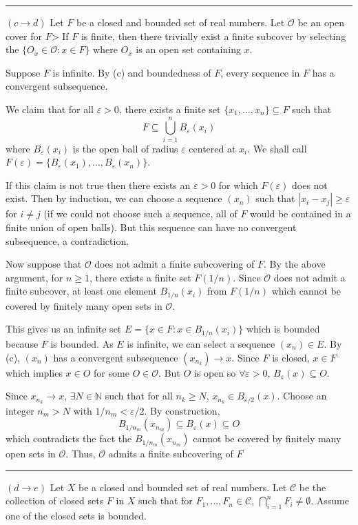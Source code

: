 \documentclass[12pt]{article}
\newcommand{\N}{\mathbb{N}}
\newcommand{\abs}[1]{\left\vert #1 \right\vert}
\newcommand{\ep}{\varepsilon}
\newcommand{\sub}{\subseteq}
\renewcommand{\div}{\vspace*{10pt}\hrule\vspace*{10pt}}
\begin{document}
    \div 

    $(c \to d)$ Let $F$ be a closed and bounded set of real numbers. Let $\mathcal{O}$ be an open cover for $F$> If $F$ is finite, then there trivially exist a finite subcover by selecting the $\{O_x \in \mathcal{O}: x \in F\}$ where $O_x$ is an open set containing $x$.

    Suppose $F$ is infinite. By (c) and boundedness of $F$, every sequence in $F$ has a convergent subsequence. 
    
    We claim that for all $\ep > 0$, there exists a finite set $\{x_1, \dots, x_n\} \sub F$ such that 
    \[F \sub \bigcup_{i=1}^n B_{\ep}(x_i)\] 
    where $B_{\ep}(x_i)$ is the open ball of radius $\ep$ centered at $x_i$. We shall call $F(\ep) = \{B_{\ep}(x_1), \dots, B_{\ep}(x_n)\}$. 

    If this claim is not true then there exists an $\ep > 0$ for which $F(\ep)$ does not exist. Then by induction, we can choose a sequence $(x_n)$ such that $\abs{x_i - x_j} \geq \ep$ for $i \neq j$ (if we could not choose such a sequence, all of $F$ would be contained in a finite union of open balls). But this sequence can have no convergent subsequence, a contradiction.

    Now suppose that $\mathcal O$ does not admit a finite subcovering of $F$. By the above argument, for $n \geq 1$, there exists a finite set $F(1/n)$. Since $\mathcal O$ does not admit a finite subcover, at least one element $B_{1/n}(x_i)$ from $F(1/n)$ which cannot be covered by finitely many open sets in $\mathcal O$. 

    This gives us an infinite set $E = \{x \in F: x \in B_{1/n}(x_i)\}$ which is bounded because $F$ is bounded. As $E$ is infinite, we can select a sequence $(x_n) \in E$. By (c), $(x_n)$ has a convergent subsequence $(x_{n_k}) \to x$. Since $F$ is closed, $x \in F$ which implies $x \in O$ for some $O \in \mathcal O$. But $O$ is open so $\forall \ep > 0$, $B_{\ep}(x) \sub O$. 
    
    Since $x_{n_k} \to x$, $\exists N \in \N$ such that for all $n_k \geq N$, $x_{n_k} \in B_{\ep/2}(x)$. Choose an integer $n_m > N$ with $1/n_m < \ep/2$. By construction, 
    \[B_{1/n_m}(x_{n_m}) \sub B_{\ep}(x) \sub O\]
    which contradicts the fact the $B_{1/n_m}(x_{n_m})$ cannot be covered by finitely many open sets in $\mathcal O$. Thus, $\mathcal O$ admits a finite subcovering of $F$

    \div 

    $(d \to e)$ Let $X$ be a closed and bounded set of real numbers. Let $\mathcal C$ be the collection of closed sets $F$ in $X$ such that for $F_1, \dots, F_n \in \mathcal{C}$, $\bigcap_{i=1}^n F_i \neq \emptyset$. Assume one of the closed sets is bounded. 
\end{document}
